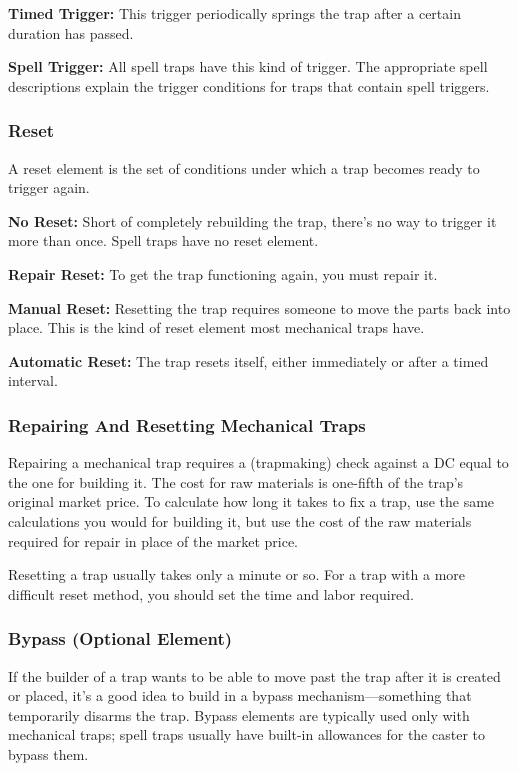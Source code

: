 \textbf{Timed Trigger:} This trigger periodically springs the trap after a certain duration has passed.

\textbf{Spell Trigger:} All spell traps have this kind of trigger. The appropriate spell descriptions explain the trigger conditions for traps that contain spell triggers.

\subsubsection{Reset}
A reset element is the set of conditions under which a trap becomes ready to trigger again.

\textbf{No Reset:} Short of completely rebuilding the trap, there’s no way to trigger it more than once. Spell traps have no reset element.

\textbf{Repair Reset:} To get the trap functioning again, you must repair it.

\textbf{Manual Reset:} Resetting the trap requires someone to move the parts back into place. This is the kind of reset element most mechanical traps have.

\textbf{Automatic Reset:} The trap resets itself, either immediately or after a timed interval.

\subsubsection{Repairing And Resetting Mechanical Traps}
Repairing a mechanical trap requires a  (trapmaking) check against a DC equal to the one for building it. The cost for raw materials is one-fifth of the trap’s original market price. To calculate how long it takes to fix a trap, use the same calculations you would for building it, but use the cost of the raw materials required for repair in place of the market price.

Resetting a trap usually takes only a minute or so. For a trap with a more difficult reset method, you should set the time and labor required.

\subsubsection{Bypass (Optional Element)}
If the builder of a trap wants to be able to move past the trap after it is created or placed, it’s a good idea to build in a bypass mechanism---something that temporarily disarms the trap. Bypass elements are typically used only with mechanical traps; spell traps usually have built-in allowances for the caster to bypass them.

